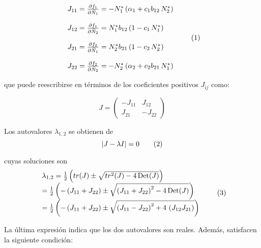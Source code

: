 \begin{equation}
\begin{array}{l}
J_{11}= \frac{\partial f_{1}}{\partial \tilde{N}_{1}} =- N^{*}_{1}\left(\alpha_{1}+ c_{1} b_{12} \, N^{*}_2\right)  \\
\\
J_{12}= \frac{\partial f_{1}}{\partial \tilde{N}_{2}} = N^{*}_{1}b_{12}\left(1 - c_{1}\, N^{*}_1\right) \\
\\
J_{21}= \frac{\partial f_{2}}{\partial \tilde{N}_{1}} = N^{*}_{2}b_{21} \left(1 - c_{2}\, N^{*}_2\right) \\
\\
J_{22}= \frac{\partial f_{2}}{\partial \tilde{N}_{2}} = - N^{*}_{2}\left(\alpha_{2}+ c_{2} b_{21}\,N^{*}_{1}\right)
\end{array}
\stepcounter{equation}\tag{\theequation}\label{eq:J11}
\end{equation}

\noindent que puede reescribirse en términos de los coeficientes positivos $J_{ij}$ como:

\begin{equation*}
J = \left(
\begin{array}{rr}
-J_{11} & J_{12} \\ J_{21} & -J_{22}
\end{array}
\right)
\end{equation*}

\noindent Los autovalores $\lambda_{1,2}$ se obtienen de
\begin{equation}
\lvert J - \lambda I \rvert =0
\stepcounter{equation}\tag{\theequation}\label{eq:lambda0App}
\end{equation}

\noindent cuyas soluciones son
\begin{equation}
\begin{array}{lcl}
\lambda _{1,2}=\frac{1}{2}\left(tr(J)\pm \sqrt{tr^{2}(J)-4\,\mathrm{Det}(J)}\right)\\ =
\frac{1}{2}\left(-\left(J_{11}+J_{22}\right)\pm \sqrt{\left(J_{11}+J_{22}\right)^{2}-4\,\mathrm{Det}(J)}\right)\\  =
\frac{1}{2}\left(-\left(J_{11}+J_{22}\right)\pm \sqrt{\left(J_{11}-J_{22}\right)^{2} +4 \,\left( J_{12}J_{21} \right) }\right)
\end{array}
\stepcounter{equation}\tag{\theequation}\label{eq:lambda12}
\end{equation}

\noindent La última expresión indica que los dos autovalores son reales. Además, satisfacen la siguiente condición:


